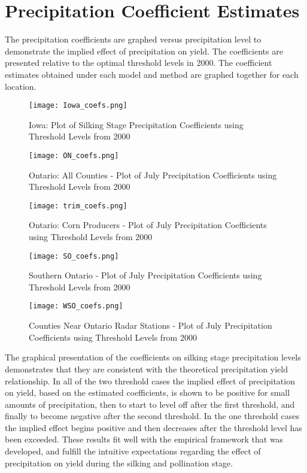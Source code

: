 \section{Precipitation Coefficient Estimates}

The precipitation coefficients are graphed versus precipitation level to demonstrate the implied effect of precipitation on yield. The coefficients are presented relative to the optimal threshold levels in 2000. The coefficient estimates obtained under each model and method are graphed together for each location.


\begin{figure}[H]
\centerfloat
 \texttt{[image: Iowa\_coefs.png]}
    \caption{Iowa: Plot of Silking Stage Precipitation Coefficients using Threshold Levels from 2000}
\end{figure}

\begin{figure}[H]
 \texttt{[image: ON\_coefs.png]}
    \caption{Ontario: All Counties - Plot of July Precipitation Coefficients using Threshold Levels from 2000}
\end{figure}


\begin{figure}[H]
\centerfloat
 \texttt{[image: trim\_coefs.png]}
    \caption{Ontario: Corn Producers - Plot of July Precipitation Coefficients using Threshold Levels from 2000}
\end{figure}

\begin{figure}[H]
\centerfloat
 \texttt{[image: SO\_coefs.png]}
    \caption{Southern Ontario - Plot of July Precipitation Coefficients using Threshold Levels from 2000}
\end{figure}

\begin{figure}[H]
\centerfloat
 \texttt{[image: WSO\_coefs.png]}
    \caption{Counties Near Ontario Radar Stations - Plot of July Precipitation Coefficients using Threshold Levels from 2000}
\end{figure}


The graphical presentation of the coefficients on silking stage precipitation levels demonstrates that they are consistent with the theoretical precipitation yield relationship. In all of the two threshold cases the implied effect of precipitation on yield, based on the estimated coefficients, is shown to be positive for small amounts of precipitation, then to start to level off after the first threshold, and finally to become negative after the second threshold. In the one threshold cases the implied effect begins positive and then decreases after the threshold level has been exceeded. These results fit well with the empirical framework that was developed, and fulfill the intuitive expectations regarding the effect of precipitation on yield during the silking and pollination stage.

